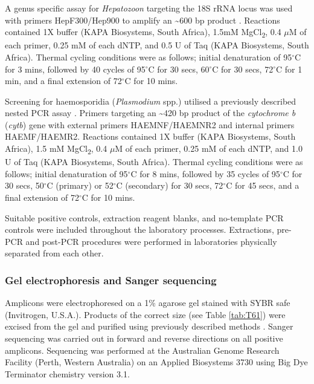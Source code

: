 \documentclass[a4paper, nobind]{templates/ociamthesis}
\begin{document}
A genus specific assay for \emph{Hepatozoon} targeting the 18S rRNA locus was used with primers HepF300/Hep900 to amplify an \textasciitilde600 bp product \autocite{ujvariHighPrevalenceHepatozoon2004}. Reactions contained 1X buffer (KAPA Biosystems, South Africa), 1.5mM MgCl\textsubscript{2}, 0.4 \(\mu\)M of each primer, 0.25 mM of each dNTP, and 0.5 U of Taq (KAPA Biosystems, South Africa). Thermal cycling conditions were as follows; initial denaturation of 95\(^\circ\)C for 3 mins, followed by 40 cycles of 95\(^\circ\)C for 30 secs, 60\(^\circ\)C for 30 secs, 72\(^\circ\)C for 1 min, and a final extension of 72\(^\circ\)C for 10 mins.

Screening for haemosporidia (\emph{Plasmodium} spp.) utilised a previously described nested PCR assay \autocite{waldenstromNewNestedPolymerase2004}. Primers targeting an \textasciitilde420 bp product of the \emph{cytochrome b} (\emph{cytb}) gene with external primers HAEMNF/HAEMNR2 and internal primers HAEMF/HAEMR2. Reactions contained 1X buffer (KAPA Biosystems, South Africa), 1.5 mM MgCl\textsubscript{2}, 0.4 \(\mu\)M of each primer, 0.25 mM of each dNTP, and 1.0 U of Taq (KAPA Biosystems, South Africa). Thermal cycling conditions were as follows; initial denaturation of 95\(^\circ\)C for 8 mins, followed by 35 cycles of 95\(^\circ\)C for 30 secs, 50\(^\circ\)C (primary) or 52\(^\circ\)C (secondary) for 30 secs, 72\(^\circ\)C for 45 secs, and a final extension of 72\(^\circ\)C for 10 mins.

Suitable positive controls, extraction reagent blanks, and no-template PCR controls were included throughout the laboratory processes. Extractions, pre-PCR and post-PCR procedures were performed in laboratories physically separated from each other.

\hypertarget{gel-electrophoresis-and-sanger-sequencing}{%
\subsubsection{Gel electrophoresis and Sanger sequencing}\label{gel-electrophoresis-and-sanger-sequencing}}

Amplicons were electrophoresed on a 1\% agarose gel stained with SYBR safe (Invitrogen, U.S.A.). Products of the correct size (see Table \ref{tab:T61}) were excised from the gel and purified using previously described methods \autocite{yangSpecificQuantitativeDetection2013}. Sanger sequencing was carried out in forward and reverse directions on all positive amplicons. Sequencing was performed at the Australian Genome Research Facility (Perth, Western Australia) on an Applied Biosystems 3730 using Big Dye Terminator chemistry version 3.1.
\end{document}
